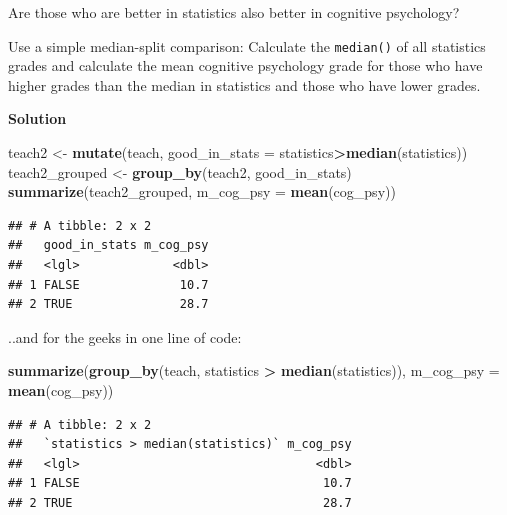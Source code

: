 \documentclass[
]{scrartcl}
\makeatletter
\newenvironment{Shaded}{\begin{snugshade}}{\end{snugshade}}
\newcommand{\AttributeTok}[1]{\textcolor[rgb]{0.13,0.29,0.53}{#1}}
\newcommand{\FunctionTok}[1]{\textcolor[rgb]{0.13,0.29,0.53}{\textbf{#1}}}
\newcommand{\NormalTok}[1]{#1}
\newcommand{\OtherTok}[1]{\textcolor[rgb]{0.56,0.35,0.01}{#1}}
\newcommand{\SpecialCharTok}[1]{\textcolor[rgb]{0.81,0.36,0.00}{\textbf{#1}}}
\newenvironment{kframe}{%
\medskip{}
\setlength{\fboxsep}{.8em}
 \def\at@end@of@kframe{}%
 \ifinner\ifhmode%
  \def\at@end@of@kframe{\end{minipage}}%
  \begin{minipage}{\columnwidth}%
 \fi\fi%
 \def\FrameCommand##1{\hskip\@totalleftmargin \hskip-\fboxsep
 \colorbox{shadecolor}{##1}\hskip-\fboxsep
     \hskip-\linewidth \hskip-\@totalleftmargin \hskip\columnwidth}%
 \MakeFramed {\advance\hsize-\width
   \@totalleftmargin\z@ \linewidth\hsize
   \@setminipage}}%
 {\par\unskip\endMakeFramed%
 \at@end@of@kframe}
\newenvironment{rmdblock}[1]
  {
  \begin{itemize}
  \renewcommand{\labelitemi}{
    \raisebox{-.7\height}[0pt][0pt]{
      {\setkeys{Gin}{width=3em,keepaspectratio}\texttt{[image: images/\#1]}}
    }
  }
  \setlength{\fboxsep}{1em}
  \begin{kframe}
  \item
  }
  {
  \end{kframe}
  \end{itemize}
  }
\newenvironment{myexercise}
    {\begin{rmdblock}{exercise_green}}
    {\end{rmdblock}}
\newenvironment{webexsolution}[1]
    {\par\tiny\textbf{#1}}
    {\par}
\newcommand{\webexhide}[1]{\begin{webexsolution}{#1}}
\newcommand{\webexunhide}{\end{webexsolution}}
\makeatother
\begin{document}
\webexunhide

\begin{myexercise}
Are those who are better in statistics also better in cognitive
psychology?

Use a simple median-split comparison: Calculate the \texttt{median()} of
all statistics grades and calculate the mean cognitive psychology grade
for those who have higher grades than the median in statistics and those
who have lower grades.
\end{myexercise}
\webexhide{Solution}

\begin{Shaded}
\begin{Highlighting}[]
\NormalTok{teach2 }\OtherTok{\textless{}{-}} \FunctionTok{mutate}\NormalTok{(teach, }\AttributeTok{good\_in\_stats =}\NormalTok{ statistics}\SpecialCharTok{\textgreater{}}\FunctionTok{median}\NormalTok{(statistics))}
\NormalTok{teach2\_grouped }\OtherTok{\textless{}{-}} \FunctionTok{group\_by}\NormalTok{(teach2, good\_in\_stats)}
\FunctionTok{summarize}\NormalTok{(teach2\_grouped, }\AttributeTok{m\_cog\_psy =} \FunctionTok{mean}\NormalTok{(cog\_psy))}
\end{Highlighting}
\end{Shaded}

\begin{verbatim}
## # A tibble: 2 x 2
##   good_in_stats m_cog_psy
##   <lgl>             <dbl>
## 1 FALSE              10.7
## 2 TRUE               28.7
\end{verbatim}

..and for the geeks in one line of code:

\begin{Shaded}
\begin{Highlighting}[]
\FunctionTok{summarize}\NormalTok{(}\FunctionTok{group\_by}\NormalTok{(teach, statistics }\SpecialCharTok{\textgreater{}} \FunctionTok{median}\NormalTok{(statistics)), }
                                \AttributeTok{m\_cog\_psy =} \FunctionTok{mean}\NormalTok{(cog\_psy))}
\end{Highlighting}
\end{Shaded}

\begin{verbatim}
## # A tibble: 2 x 2
##   `statistics > median(statistics)` m_cog_psy
##   <lgl>                                 <dbl>
## 1 FALSE                                  10.7
## 2 TRUE                                   28.7
\end{verbatim}
\end{document}
